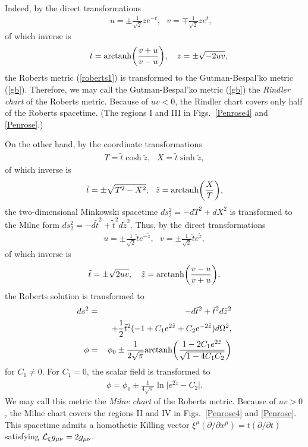 \documentclass[aps,prd,twocolumn,eqsecnum,showpacs,amsmath]{revtex4}
\begin{document}
Indeed, by the direct transformations
\begin{eqnarray}
&&u=\pm\frac{1}{\sqrt{2}}ze^{-t}, ~~~v=\mp\frac{1}{\sqrt{2}}ze^{t}, \label{trans-1a}
\end{eqnarray}
of which inverse is
\begin{eqnarray}
&&t={\rm arctanh}\biggl(\frac{v+u}{v-u}\biggl), ~~~z=\pm \sqrt{-2uv}, \label{trans-1b}
\end{eqnarray}
the Roberts metric (\ref{roberts1}) is transformed to the Gutman-Bespal'ko metric (\ref{gb}).
Therefore, we may call the Gutman-Bespal'ko metric (\ref{gb}) the {\it Rindler chart} of the Roberts metric. 
Because of $uv<0$, the Rindler chart covers only half of the Roberts spacetime.
(The regions I and III in Figs.~\ref{Penrose4} and \ref{Penrose}.)

On the other hand, by the coordinate transformations
\begin{eqnarray}
T={\tilde t}\cosh {\tilde z}, ~~~X={\tilde t}\sinh {\tilde z},
\end{eqnarray}
of which inverse is
\begin{eqnarray}
{\tilde t}=\pm \sqrt{T^2-X^2},~~{\tilde z}={\rm arctanh}\biggl(\frac{X}{T}\biggl),
\end{eqnarray}
the two-dimensional Minkowski spacetime $ds_2^2=-dT^2+dX^2$ is transformed to the Milne form $ds_2^2=-d{\tilde t}^2+{\tilde t}^2d{\tilde z}^2$.
Thus, by the direct transformations
\begin{eqnarray}
u=\pm\frac{1}{\sqrt{2}}{\tilde t}e^{-{\tilde z}}, ~~~v=\pm\frac{1}{\sqrt{2}}{\tilde t}e^{\tilde z}, \label{trans-2a}
\end{eqnarray}
of which inverse is
\begin{eqnarray}
{\tilde t}=\pm\sqrt{2uv},~~~{\tilde z}={\rm arctanh}\biggl(\frac{v-u}{v+u}\biggl), \label{trans-2b}
\end{eqnarray}
the Roberts solution is transformed to
\begin{eqnarray}
ds^2&=&-d{\tilde t}^2+{\tilde t}^2d{\tilde z}^2 \nonumber \\
&&~~+\frac12{\tilde t}^2(-1+C_1e^{2{\tilde z}}+C_2e^{-2{\tilde z}})d\Omega^2,\label{roberts-milne}\\
\phi&=&\phi_0 \pm \frac{1}{2\sqrt{\pi}}{\rm arctanh}\biggl(\frac{1-2C_1e^{2{\tilde z}}}{\sqrt{1-4C_1C_2}}\biggl)
\end{eqnarray}
for $C_1 \ne 0$. 
For $C_1=0$, the scalar field is transformed to 
\begin{eqnarray}
\phi=\phi_0\pm \frac{1}{4\sqrt{\pi}}\ln\biggl|e^{2{\tilde z}}-C_2\biggl|.
\end{eqnarray}
We may call this metric the {\it Milne chart} of the Roberts metric. 
Because of $uv>0$, the Milne chart covers the regions II and IV in Figs.~\ref{Penrose4} and \ref{Penrose}.
This spacetime admits a homothetic Killing vector $\xi^\mu(\partial/\partial x^\mu)=t(\partial/\partial t)$ satisfying ${\cal  L}_{\xi} g_{\mu\nu} = 2g_{\mu\nu} $.
\end{document}
